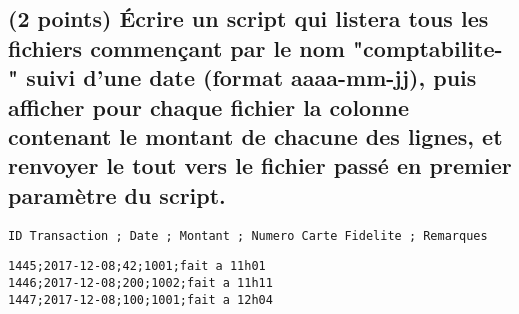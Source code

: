 \documentclass[11pt,a4paper]{article}
\begin{document}
\bigskip

\pagebreak

\subsection{(2 points) \'Ecrire un script qui listera tous les fichiers commençant par le nom "comptabilite-" suivi d'une date (format aaaa-mm-jj), puis afficher pour chaque fichier la colonne contenant le montant de chacune des lignes, et renvoyer le tout vers le fichier passé en premier paramètre du script.}

\bigskip

\lstset{language=sh}
\begin{lstlisting}[frame=single,title={Format des fichiers de transactions}]
ID Transaction ; Date ; Montant ; Numero Carte Fidelite ; Remarques
\end{lstlisting}

\lstset{language=sh}
\begin{lstlisting}[frame=single,title={comptabilite-2017-12-08}]
1445;2017-12-08;42;1001;fait a 11h01
1446;2017-12-08;200;1002;fait a 11h11
1447;2017-12-08;100;1001;fait a 12h04
\end{lstlisting}
\end{document}
